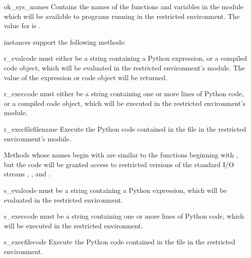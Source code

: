 \begin{datadesc}{ok_sys_names}
Contains the names of the functions and variables in the 
module which will be available to programs running in the restricted
environment.  The value for  is 
   
 .
\end{datadesc}

 instances support the following methods:

\begin{funcdesc}{r_eval}{code}
 must either be a string containing a Python expression, or
a compiled code object, which will be evaluated in the restricted
environment's  module.  The value of the expression or
code object will be returned.
\end{funcdesc}

\begin{funcdesc}{r_exec}{code}
 must either be a string containing one or more lines of
Python code, or a compiled code object, which will be executed in the
restricted environment's  module.
\end{funcdesc}

\begin{funcdesc}{r_execfile}{filename}
Execute the Python code contained in the file  in the
restricted environment's  module.
\end{funcdesc}

Methods whose names begin with  are similar to the functions
beginning with , but the code will be granted access to
restricted versions of the standard I/O streans ,
, and .  

\begin{funcdesc}{s_eval}{code}
 must be a string containing a Python expression, which will
be evaluated in the restricted environment.  
\end{funcdesc}

\begin{funcdesc}{s_exec}{code}
 must be a string containing one or more lines of Python code,
which will be executed in the restricted environment.  
\end{funcdesc}

\begin{funcdesc}{s_execfile}{code}
Execute the Python code contained in the file  in the
restricted environment.
\end{funcdesc}


